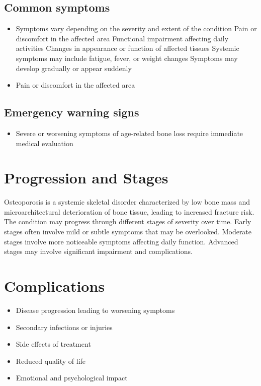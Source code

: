 \subsection{Common symptoms}
\begin{itemize}[noitemsep]
  \item Symptoms vary depending on the severity and extent of the condition Pain or discomfort in the affected area Functional impairment affecting daily activities Changes in appearance or function of affected tissues Systemic symptoms may include fatigue, fever, or weight changes Symptoms may develop gradually or appear suddenly
  \item Pain or discomfort in the affected area
  \end{itemize}

\subsection{Emergency warning signs}
\begin{itemize}[noitemsep]
  \item Severe or worsening symptoms of age-related bone loss require immediate medical evaluation
\end{itemize}
\section{Progression and Stages}
Osteoporosis is a systemic skeletal disorder characterized by low bone mass and microarchitectural deterioration of bone tissue, leading to increased fracture risk. The condition may progress through different stages of severity over time. Early stages often involve mild or subtle symptoms that may be overlooked. Moderate stages involve more noticeable symptoms affecting daily function. Advanced stages may involve significant impairment and complications.
\section{Complications}
\begin{itemize}[noitemsep]
  \item Disease progression leading to worsening symptoms
  \item Secondary infections or injuries
  \item Side effects of treatment
  \item Reduced quality of life
  \item Emotional and psychological impact
\end{itemize}
